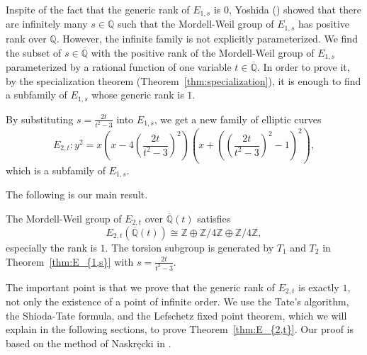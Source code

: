 \documentclass[main]{subfiles}
\begin{document}
Inspite of the fact that the generic rank of $E_{1,s}$ is $0$, Yoshida (\cite[Corollary 4.7.]{ref:yoshida}) showed that there are infinitely many $s \in \mathbb{Q}$ such that the Mordell-Weil group of $E_{1,s}$ has positive rank over $\mathbb{Q}$.
However, the infinite family is not explicitly parameterized.
We find the subset of $s \in \overline{{\mathbb{Q}}}$ with the positive rank of the Mordell-Weil group of $E_{1,s}$ parameterized by a rational function of one variable $t \in \overline{\mathbb{Q}}$.
In order to prove it, by the specialization theorem (Theorem~\ref{thm:specialization}), it is enough to find a subfamily of $E_{1,s}$ whose generic rank is $1$.

By substituting $s = \frac{2t}{t^{2} - 3}$ into $E_{1,s}$, we get a new family of elliptic curves
\begin{equation*}
    E_{2,t}: y^{2} = x \left(x - 4 \left(\frac{2t}{t^{2} - 3} \right)^{2} \right) \left(x + \left(\left(\frac{2t}{t^{2} - 3} \right)^{2} - 1 \right)^{2} \right),
\end{equation*}
which is a subfamily of $E_{1,s}$.

The following is our main result.
\begin{thm}
    \label{thm:E_{2,t}}
    The Mordell-Weil group of $E_{2,t}$ over $\overline{\mathbb{Q}}(t)$ satisfies
    \begin{equation*}
        E_{2,t}(\overline{\mathbb{Q}}(t)) \cong \mathbb{Z} \oplus \mathbb{Z} / 4 \mathbb{Z} \oplus \mathbb{Z} / 4 \mathbb{Z},
    \end{equation*}
    especially the rank is $1$.
    The torsion subgroup is generated by $T_1$ and $T_2$ in Theorem~\ref{thm:E_{1,s}} with $s = \frac{2t}{t^{2} - 3}$.
\end{thm}
The important point is that we prove that the generic rank of $E_{2,t}$ is exactly $1$, not only the existence of a point of infinite order.
We use the Tate's algorithm, the Shioda-Tate formula, and the Lefschetz fixed point theorem, which we will explain in the following sections, to prove Theorem~\ref{thm:E_{2,t}}.
Our proof is based on the method of Naskręcki in \cite{ref:naskrecki2013}.
\end{document}
